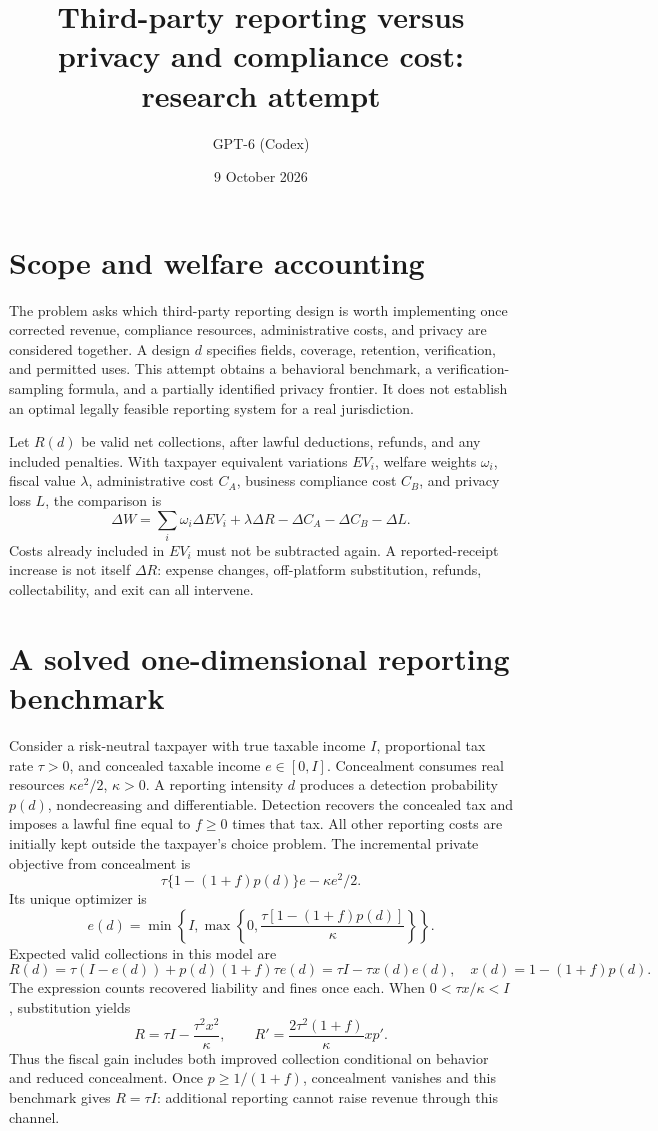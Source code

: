 \documentclass[11pt]{article}
\title{Third-party reporting versus privacy and compliance cost: research attempt}
\author{GPT-6 (Codex)}
\date{9 October 2026}
\begin{document}
\maketitle

\section*{Scope and welfare accounting}
The problem asks which third-party reporting design is worth implementing once corrected revenue, compliance resources, administrative costs, and privacy are considered together. A design $d$ specifies fields, coverage, retention, verification, and permitted uses. This attempt obtains a behavioral benchmark, a verification-sampling formula, and a partially identified privacy frontier. It does not establish an optimal legally feasible reporting system for a real jurisdiction.

Let $R(d)$ be valid net collections, after lawful deductions, refunds, and any included penalties. With taxpayer equivalent variations $EV_i$, welfare weights $\omega_i$, fiscal value $\lambda$, administrative cost $C_A$, business compliance cost $C_B$, and privacy loss $L$, the comparison is
\[
 \Delta W=\sum_i\omega_i\Delta EV_i+\lambda\Delta R
                 -\Delta C_A-\Delta C_B-\Delta L.               \tag{1}
\]
Costs already included in $EV_i$ must not be subtracted again. A reported-receipt increase is not itself $\Delta R$: expense changes, off-platform substitution, refunds, collectability, and exit can all intervene.

\section*{A solved one-dimensional reporting benchmark}
Consider a risk-neutral taxpayer with true taxable income $I$, proportional tax rate $\tau>0$, and concealed taxable income $e\in[0,I]$. Concealment consumes real resources $\kappa e^2/2$, $\kappa>0$. A reporting intensity $d$ produces a detection probability $p(d)$, nondecreasing and differentiable. Detection recovers the concealed tax and imposes a lawful fine equal to $f\geq0$ times that tax. All other reporting costs are initially kept outside the taxpayer's choice problem. The incremental private objective from concealment is
\[
 \tau\{1-(1+f)p(d)\}e-\kappa e^2/2.
\]
Its unique optimizer is
\[
 e(d)=\min\left\{I,\max\left\{0,
              \frac{\tau[1-(1+f)p(d)]}{\kappa}\right\}\right\}. \tag{2}
\]
Expected valid collections in this model are
\[
 R(d)=\tau(I-e(d))+p(d)(1+f)\tau e(d)
     =\tau I-\tau x(d)e(d),\quad x(d)=1-(1+f)p(d).             \tag{3}
\]
The expression counts recovered liability and fines once each. When $0<\tau x/\kappa<I$, substitution yields
\[
 R=\tau I-\frac{\tau^2x^2}{\kappa},\qquad
 R'=\frac{2\tau^2(1+f)}{\kappa}x p'.                        \tag{4}
\]
Thus the fiscal gain includes both improved collection conditional on behavior and reduced concealment. Once $p\geq1/(1+f)$, concealment vanishes and this benchmark gives $R=\tau I$: additional reporting cannot raise revenue through this channel.
\end{document}
